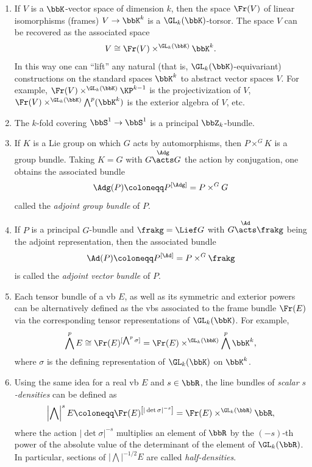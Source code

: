 \begin{example}\label{ex associated bundles}
    \begin{enumerate}
        \item If $V$ is a $\bbK$-vector space of dimension $k$, then the space $\Fr(V)$ of linear isomorphisms (frames) $V\to \bbK^k$ is a $\GL_k(\bbK)$-torsor. The space $V$ can be recovered as the associated space
        \[V\cong \Fr(V)\times^{\GL_k(\bbK)} \bbK^k.\]
        In this way one can ``lift'' any natural (that is, $\GL_k(\bbK)$-equivariant) constructions on the standard spaces $\bbK^k$ to abstract vector spaces $V$. For example, $\Fr(V)\times^{\GL_k(\bbK)} \KP^{k-1}$ is the projectivization of $V$, $\Fr(V)\times^{\GL_k(\bbK)}\bigwedge^p(\bbK^k)$ is the exterior algebra of $V$, etc.
        
        \item The $k$-fold covering $\bbS^1\to \bbS^1$ is a principal $\bbZ_k$-bundle.
        
        \item If $K$ is a Lie group on which $G$ acts by automorphisms, then $P\times^G K$ is a group bundle. Taking $K=G$ with $G\overset{\Adg}{\acts}G$ the action by conjugation, one obtains the associated bundle \[\Adg(P)\coloneqq P^{[\Adg]}=P\times^G G\]
        called the \emph{adjoint group bundle} of $P$. 

        \item If $P$ is a principal $G$-bundle and $\frakg=\Lief G$ with $G\overset{\Ad}{\acts}\frakg$ being the adjoint representation, then the associated bundle \[\Ad(P)\coloneqq P^{[\Ad]}=P\times^G \frakg\] is called the \emph{adjoint vector bundle} of $P$. 
       
        \item Each tensor bundle of a \gls{vb} $E$, as well as its symmetric and exterior powers can be alternatively defined as the \glspl{vb} associated to the frame bundle $\Fr(E)$ via the corresponding tensor representations of $\GL_k(\bbK)$. For example, \[\bigwedge^p E\cong \Fr(E)^{[\bigwedge^p \sigma]}=\Fr(E)\times^{\GL_k(\bbK)} \bigwedge^p \bbK^k,\]
        where $\sigma$ is the defining representation of $\GL_k(\bbK)$ on $\bbK^k$. 
        
        \item Using the same idea for a real \gls{vb} $E$ and $s\in\bbR$, the line bundles of \emph{scalar $s$-densities} can be defined as
        \[\left|\bigwedge\right|^s E\coloneqq \Fr(E)^{\left[|\det \sigma|^{-s}\right]}=\Fr(E)\times^{\GL_k(\bbR)}\bbR,\]
        where the action $|\det \sigma|^{-s}$ multiplies an element of $\bbR$ by the $(-s)$-th power of the absolute value of the determinant of the element of $\GL_k(\bbR)$. In particular, sections of $\left|\bigwedge\right|^{-1/2}E$ are called \emph{half-densities}.
        

\end{enumerate}
\end{example}
